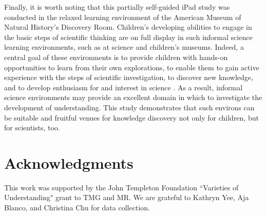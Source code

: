 \documentclass[man,floatsintext]{apa6}
\begin{document}
Finally, it is worth noting that this partially self-guided iPad study was conducted in the relaxed learning environment of the American Museum of Natural History's Discovery Room. 
Children's developing abilities to engage in the basic steps of scientific 
 thinking are on full display in such informal science learning environments, such as at 
science and children's museums. Indeed, a central goal of these environments is to 
provide children with hands-on opportunities to learn from their own explorations, to 
enable them to gain active experience with the steps of scientific investigation, to 
discover new knowledge, and to develop enthusiasm for and interest in science 
\cite{Bell:2009,Fenichel:2010}. As a result, informal science 
environments may provide an excellent domain in which to investigate the development of understanding. This study demonstrates that such environs can be suitable and fruitful venues for knowledge discovery not only for children, but for scientists, too.

\section{Acknowledgments}

This work was supported by the John Templeton Foundation 
``Varieties of Understanding" grant to TMG and MR. 
We are grateful to Kathryn Yee, Aja Blanco, and Christina Chu for data collection.





\end{document}
